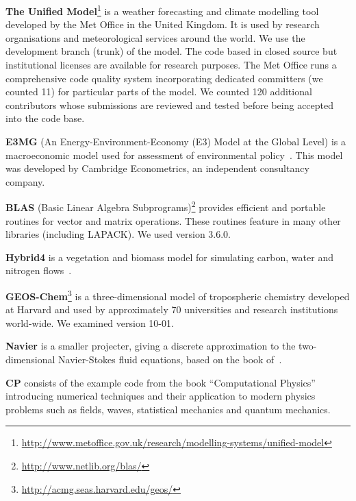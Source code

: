 \documentclass[9pt]{sigplanconf}
\theoremstyle{definition}
\begin{document}
\textbf{The Unified
  Model}\footnote{\url{http://www.metoffice.gov.uk/research/modelling-systems/unified-model}}
is a weather forecasting and climate modelling tool developed by the
Met Office in the United Kingdom. It is used by research organisations
and meteorological services around the world. We use the development
branch (trunk) of the model. The code based in closed source but
institutional licenses are available for research purposes. The Met Office runs a comprehensive code quality system incorporating dedicated committers (we counted 11) for particular parts of the model. We counted 120 additional contributors whose submissions are reviewed and tested before being accepted into the code base.

\textbf{E3MG} (An Energy-Environment-Economy (E3) Model at the Global Level) is a macroeconomic model used for assessment of environmental policy~\cite{RePEc:aen:journl:2006se-a12}. This model was developed by Cambridge Econometrics, an independent consultancy company.

\textbf{BLAS} (Basic Linear Algebra Subprograms)\footnote{\url{http://www.netlib.org/blas/}} provides efficient and portable routines for vector and matrix operations. These routines feature in many other libraries (including LAPACK). We used version 3.6.0.

\textbf{Hybrid4} is a vegetation and biomass model for simulating carbon, water and nitrogen flows~\cite{GBC:GBC635}.

\textbf{GEOS-Chem}\footnote{\url{http://acmg.seas.harvard.edu/geos/}} is a three-dimensional model of tropospheric chemistry developed at Harvard and used by approximately 70 universities and research institutions world-wide. We examined version 10-01.

\textbf{Navier} is a smaller projecter, giving a discrete
approximation to the two-dimensional Navier-Stokes fluid equations,
based on the book of~\citet{griebel1997numerical}.

\textbf{CP} consists of the example code from the book ``Computational Physics''~\cite{nicholas2006computational} introducing numerical techniques and their application to modern physics problems such as fields, waves, statistical mechanics and quantum mechanics.


\end{document}
